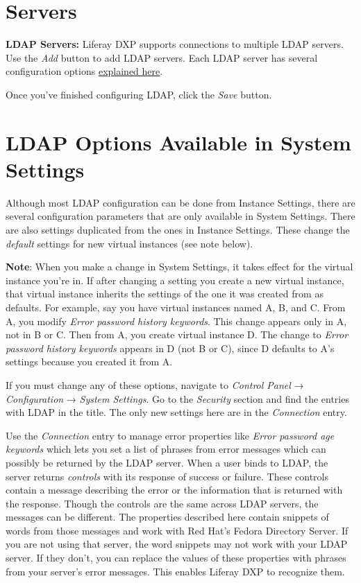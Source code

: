 \section{Servers}\label{servers}

\textbf{LDAP Servers:} Liferay DXP supports connections to multiple LDAP
servers. Use the \emph{Add} button to add LDAP servers. Each LDAP server
has several configuration options
\href{/docs/7-2/deploy/-/knowledge_base/d/ldap}{explained here}.

Once you've finished configuring LDAP, click the \emph{Save} button.

\section{LDAP Options Available in System
Settings}\label{ldap-options-available-in-system-settings}

Although most LDAP configuration can be done from Instance Settings,
there are several configuration parameters that are only available in
System Settings. There are also settings duplicated from the ones in
Instance Settings. These change the \emph{default} settings for new
virtual instances (see note below).

\noindent\hrulefill

\textbf{Note}: When you make a change in System Settings, it takes
effect for the virtual instance you're in. If after changing a setting
you create a new virtual instance, that virtual instance inherits the
settings of the one it was created from as defaults. For example, say
you have virtual instances named A, B, and C. From A, you modify
\emph{Error password history keywords}. This change appears only in A,
not in B or C. Then from A, you create virtual instance D. The change to
\emph{Error password history keywords} appears in D (not B or C), since
D defaults to A's settings because you created it from A.

\noindent\hrulefill

If you must change any of these options, navigate to \emph{Control
Panel} → \emph{Configuration} → \emph{System Settings}. Go to the
\emph{Security} section and find the entries with LDAP in the title. The
only new settings here are in the \emph{Connection} entry.

Use the \emph{Connection} entry to manage error properties like
\emph{Error password age keywords} which lets you set a list of phrases
from error messages which can possibly be returned by the LDAP server.
When a user binds to LDAP, the server returns \emph{controls} with its
response of success or failure. These controls contain a message
describing the error or the information that is returned with the
response. Though the controls are the same across LDAP servers, the
messages can be different. The properties described here contain
snippets of words from those messages and work with Red Hat's Fedora
Directory Server. If you are not using that server, the word snippets
may not work with your LDAP server. If they don't, you can replace the
values of these properties with phrases from your server's error
messages. This enables Liferay DXP to recognize them.

